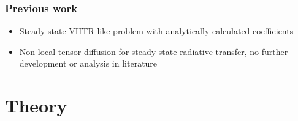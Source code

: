 \documentclass{beamer}
\begin{document}
\begin{frame}
  \frametitle{Previous work}
  \begin{itemize}
    \item Steady-state VHTR-like problem with analytically calculated
      coefficients \cite{Lar2009c}
    \item Non-local tensor diffusion \cite{Mor2007} for steady-state
      radiative transfer, no further development or
      analysis in literature
  \end{itemize}
\end{frame}
\section{Theory}
\end{document}
